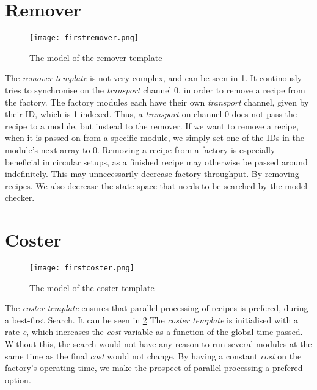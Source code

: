 \section{Remover}
\label{subs:remover}

\begin{figure}[h]
\centering
\texttt{[image: firstremover.png]}
\caption{The model of the remover template}
\label{fig:firstremover}
\end{figure}

The \emph{remover template} is not very complex, and can be seen in \cref{fig:firstremover}. It continously tries to synchronise on the \emph{transport} channel 0, in order to remove a recipe from the factory. The factory modules each have their own \emph{transport} channel, given by their ID, which is 1-indexed. Thus, a \emph{transport} on channel 0 does not pass the recipe to a module, but instead to the remover. If we want to remove a recipe, when it is passed on from a specific module, we simply set one of the IDs in the module’s next array to 0. Removing a recipe from a factory is especially beneficial in circular setups, as a finished recipe may otherwise be passed around indefinitely. This may unnecessarily decrease factory throughput. By removing recipes. We also decrease the state space that needs to be searched by the model checker.

\section{Coster}
\label{subs:coster}

\begin{figure}[h]
\centering
\texttt{[image: firstcoster.png]}
\caption{The model of the coster template}
\label{fig:firstcoster}
\end{figure}

The \emph{coster template} ensures that parallel processing of recipes is prefered, during a best-first Search. It can be seen in \cref{fig:firstcoster} The \emph{coster template} is initialised with a rate \emph{c}, which increases the \emph{cost} variable as a function of the global time passed. Without this, the search would not have any reason to run several modules at the same time as the final \emph{cost} would not change. By having a constant \emph{cost} on the factory’s operating time, we make the prospect of parallel processing a prefered option.

